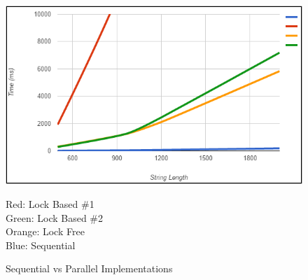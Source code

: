 \documentclass[letterpaper, 10 pt, conference]{IEEEconf}
\begin{document}
\begin{figure}
\centering
\includegraphics[scale=0.6]{sequential_vs_parallel}
\caption{Sequential vs Parallel Implementations}
\medskip
\small
Red: Lock Based \#1\\ Green: Lock Based \#2\\ Orange: Lock Free\\ Blue: Sequential    
\end{figure}
\end{document}
